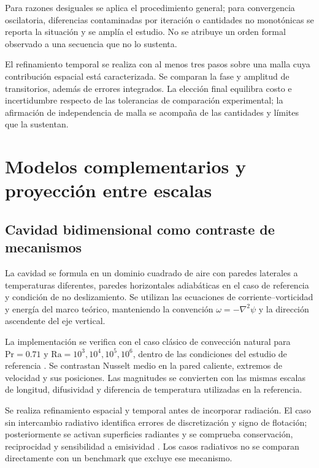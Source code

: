 Para razones desiguales se aplica el procedimiento general; para convergencia oscilatoria, diferencias contaminadas por iteración o cantidades no monotónicas se reporta la situación y se amplía el estudio. No se atribuye un orden formal observado a una secuencia que no lo sustenta.

El refinamiento temporal se realiza con al menos tres pasos sobre una malla cuya contribución espacial está caracterizada. Se comparan la fase y amplitud de transitorios, además de errores integrados. La elección final equilibra costo e incertidumbre respecto de las tolerancias de comparación experimental; la afirmación de independencia de malla se acompaña de las cantidades y límites que la sustentan.

\section{Modelos complementarios y proyección entre escalas}
\label{met:modelos_complementarios}

\subsection{Cavidad bidimensional como contraste de mecanismos}
\label{met:cavidad}

La cavidad se formula en un dominio cuadrado de aire con paredes laterales a temperaturas diferentes, paredes horizontales adiabáticas en el caso de referencia y condición de no deslizamiento. Se utilizan las ecuaciones de corriente--vorticidad y energía del marco teórico, manteniendo la convención $\omega=-\nabla^2\psi$ y la dirección ascendente del eje vertical.

La implementación se verifica con el caso clásico de convección natural para $\mathrm{Pr}=0.71$ y $\mathrm{Ra}=10^3,10^4,10^5,10^6$, dentro de las condiciones del estudio de referencia \cite{devahl1983}. Se contrastan Nusselt medio en la pared caliente, extremos de velocidad y sus posiciones. Las magnitudes se convierten con las mismas escalas de longitud, difusividad y diferencia de temperatura utilizadas en la referencia.

Se realiza refinamiento espacial y temporal antes de incorporar radiación. El caso sin intercambio radiativo identifica errores de discretización y signo de flotación; posteriormente se activan superficies radiantes y se comprueba conservación, reciprocidad y sensibilidad a emisividad \cite{balaji1993}. Los casos radiativos no se comparan directamente con un benchmark que excluye ese mecanismo.

